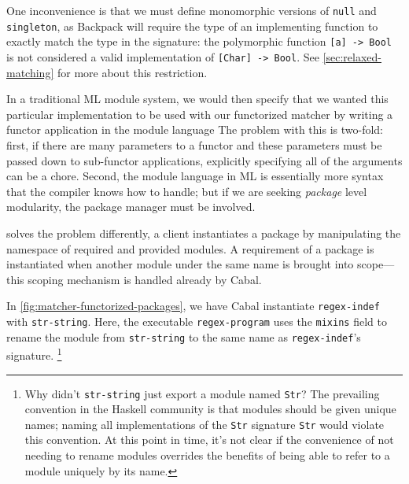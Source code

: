 One inconvenience is that we must define monomorphic
versions of \verb|null| and \verb|singleton|, as Backpack will require
the type of an implementing function to exactly match the type
in the signature: the polymorphic function \verb|[a] -> Bool| is not
considered a valid implementation of \verb|[Char] -> Bool|.  See
\cref{sec:relaxed-matching} for more about this restriction.




In a traditional ML module system, we would then specify that we wanted this
particular implementation to be used with our functorized matcher by writing
a functor application in the module language
The problem with this is two-fold: first, if there are many parameters to a functor
and these parameters must be passed down to sub-functor applications, explicitly specifying
all of the arguments can be a chore.  Second, the module language in ML is essentially
more syntax that the compiler knows how to handle; but if we are seeking
\emph{package} level modularity, the package manager must be involved.

\Backpack{} solves the problem differently, a client instantiates a package
by manipulating the namespace of required and provided modules.
A requirement of a package is instantiated when
another module under the same name is brought into scope---this scoping
mechanism is handled already by Cabal.

In \cref{fig:matcher-functorized-packages}, we have Cabal instantiate
\verb|regex-indef| with \verb|str-string|.
Here, the executable \verb|regex-program| uses the
\verb|mixins| field to rename the module from \verb|str-string| to the
same name as \verb|regex-indef|'s signature.%
%
\footnote{Why didn't \texttt{str-string} just export
a module named \texttt{Str}?  The prevailing convention in the Haskell
community is that modules should be given unique names; naming all
implementations of the \texttt{Str} signature \texttt{Str} would violate
this convention.  At this point in time, it's not clear if the
convenience of not needing to rename modules overrides the benefits of
being able to refer to a module uniquely by its name.}

